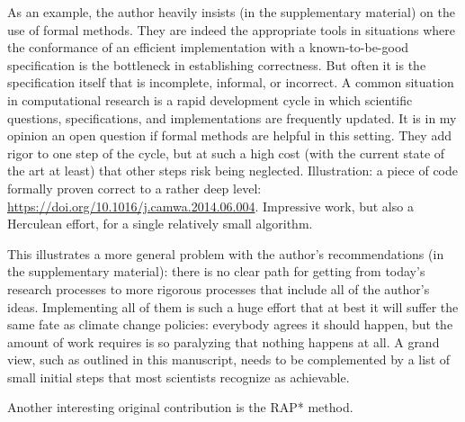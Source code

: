 \documentclass[11pt]{article}
\begin{document}
As an example, the author heavily insists (in the supplementary material) on the use of formal methods. They are indeed the appropriate tools in situations where the conformance of an efficient implementation with a known-to-be-good specification is the bottleneck in establishing correctness. But often it is the specification itself that is incomplete, informal, or incorrect. A common situation in computational research is a rapid development cycle in which scientific questions, specifications, and implementations are frequently updated. It is in my opinion an open question if formal methods are helpful in this setting. They add rigor to one step of the cycle, but at such a high cost (with the current state of the art at least) that other steps risk being neglected. Illustration: a piece of code formally proven correct to a rather deep level: \url{https://doi.org/10.1016/j.camwa.2014.06.004}. Impressive work, but also a Herculean effort, for a single relatively small algorithm. 

This illustrates a more general problem with the author's recommendations (in the supplementary material): there is no clear path for getting from today's research processes to more rigorous processes that include all of the author's ideas. Implementing all of them is such a huge effort that at best it will suffer the same fate as climate change policies: everybody agrees it should happen, but the amount of work requires is so paralyzing that nothing happens at all. A grand view, such as outlined in this manuscript, needs to be complemented by a list of small initial steps that most scientists recognize as achievable. 

Another interesting original contribution is the RAP* method. 
\end{document}

